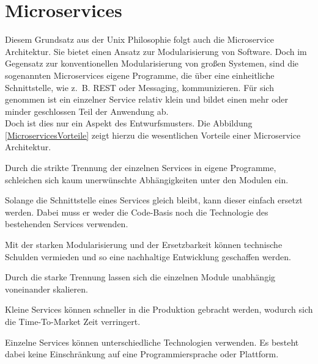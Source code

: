 \section{Microservices}


Diesem Grundsatz aus der Unix Philosophie folgt auch die Microservice Architektur. Sie bietet einen Ansatz zur Modularisierung von Software. Doch im Gegensatz zur konventionellen Modularisierung von großen Systemen, sind die sogenannten Microservices eigene Programme\cite[10]{Wolff2015}, die über eine einheitliche Schnittstelle, wie z.~B. \ac{REST} oder Messaging, kommunizieren. Für sich genommen ist ein einzelner Service relativ klein und bildet einen mehr oder minder geschlossen Teil der Anwendung ab\cite{Roewekamp2016}.\\
Doch ist dies nur ein Aspekt des Entwurfsmusters. Die Abbildung \ref{MicroservicesVorteile} zeigt hierzu die wesentlichen Vorteile einer Microservice Architektur.


\begin{description}[leftmargin=!,labelwidth=\widthof{\bfseries Ergänzung Legacy-Systeme}]
	\item[Starke Modularisierung] 
	 	Durch die strikte Trennung der einzelnen Services in eigene Programme, schleichen sich kaum unerwünschte Abhängigkeiten unter den Modulen ein.
	\item[Ersetzbarkeit]
		Solange die Schnittstelle eines Services gleich bleibt, kann dieser einfach ersetzt werden. Dabei muss er weder die Code-Basis noch die Technologie des bestehenden Services verwenden.
	\item[Nachhaltige Entwicklung] 
		Mit der starken Modularisierung und der Ersetzbarkeit können technische Schulden vermieden und so eine nachhaltige Entwicklung geschaffen werden.
	\item[Effiziente Skalierung]
		Durch die starke Trennung lassen sich die einzelnen Module unabhängig voneinander skalieren.
	\item[Continuous Delivery]
		Kleine Services können schneller in die Produktion gebracht werden, wodurch sich die Time-To-Market Zeit verringert. 
	\item[Technologie Freiheit]
		Einzelne Services können unterschiedliche Technologien verwenden. Es besteht dabei keine Einschränkung auf eine Programmiersprache oder Plattform.
\end{description}

